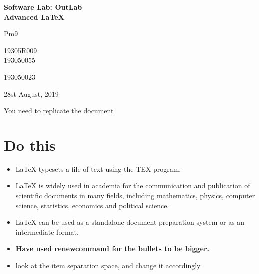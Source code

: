 \documentclass[12pt,a4paper]{article}
\begin{document}
\begin{titlepage} 
    \centering     
    \vspace*{3.5cm}         
    
    \vspace*{2.4cm}     
 
    \Huge \textbf{Software Lab: OutLab\\Advanced \LaTeX}     
 
    \vspace*{0.8cm}     
 
    \LARGE{Pm9}
     
    \large{19305R009} \\
    \large{193050055}
     
    \large{193050023}
    \vspace*{0.5cm}     
 
    \large{28st August, 2019}     
    \vspace*{4.0cm}     
 
    \vspace*{\fill} 
\end{titlepage}
\setcounter{page}{1} 
\tableofcontents 

\newpage

You need to replicate the document

\section{Do this}


\begin{itemize}

\item \LaTeX{} typesets a file of text using the TEX program.
\\
\item \LaTeX{} is widely used in academia for the communication and publication
of scientific documents in many fields, including mathematics, physics,
computer science, statistics, economics and political science.
\\
\item \LaTeX{} can be used as a standalone document preparation system or as an
intermediate format.
\\
\item \textbf{Have used renewcommand for the bullets to be bigger.}
\\
\item look at the item separation space, and change it accordingly

\end{itemize}
\end{document}

